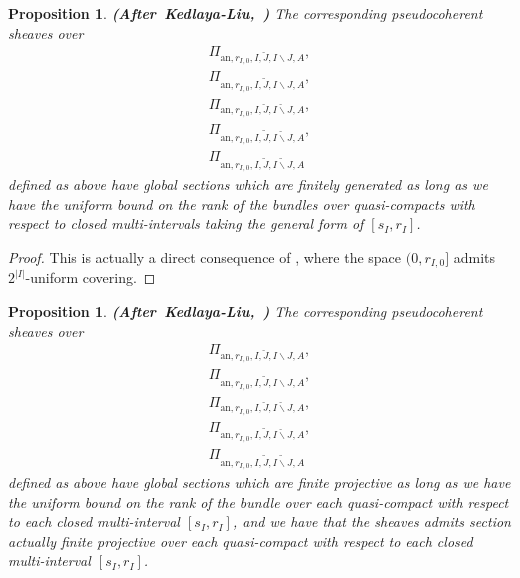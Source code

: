 \documentclass[12pt]{amsart}
\newtheorem{proposition}[theorem]{Proposition}
\theoremstyle{definition}
\numberwithin{equation}{section}
\begin{document}
\begin{proposition} \mbox{\bf{(After Kedlaya-Liu, \cite[Proposition 2.6.17]{KL2})}} \label{proposition2.18}
The corresponding pseudocoherent sheaves over
\begin{align}
\Pi_{\mathrm{an},r_{I,0},I,\breve{J},I\backslash J,A},\\
\Pi_{\mathrm{an},r_{I,0},I,\widetilde{J},I\backslash J,A},\\
\Pi_{\mathrm{an},r_{I,0},I,\breve{J},\breve{I\backslash J},A},\\
\Pi_{\mathrm{an},r_{I,0},I,\widetilde{J},\breve{I\backslash J},A},\\
\Pi_{\mathrm{an},r_{I,0},I,\widetilde{J},\widetilde{I\backslash J},A}
\end{align}
defined as above have global sections which are finitely generated as long as we have the uniform bound on the rank of the bundles over quasi-compacts with respect to closed multi-intervals taking the general form of $[s_I,r_I]$. 	
\end{proposition}


\begin{proof}
This is actually a direct consequence of \cite[Proposition 2.6.17]{KL2}, where the space $(0,r_{I,0}]$ admits $2^{|I|}$-uniform covering.	
\end{proof}


\begin{proposition} \mbox{\bf{(After Kedlaya-Liu, \cite[Corollary 2.6.8, Proposition 2.6.17]{KL2})}} \label{proposition2.19}
The corresponding pseudocoherent sheaves over
\begin{align}
\Pi_{\mathrm{an},r_{I,0},I,\breve{J},I\backslash J,A},\\
\Pi_{\mathrm{an},r_{I,0},I,\widetilde{J},I\backslash J,A},\\
\Pi_{\mathrm{an},r_{I,0},I,\breve{J},\breve{I\backslash J},A},\\
\Pi_{\mathrm{an},r_{I,0},I,\widetilde{J},\breve{I\backslash J},A},\\
\Pi_{\mathrm{an},r_{I,0},I,\widetilde{J},\widetilde{I\backslash J},A}
\end{align}
defined as above have global sections which are finite projective as long as we have the uniform bound on the rank of the bundle over each quasi-compact with respect to each closed multi-interval $[s_I,r_I]$, and we have that the sheaves admits section actually finite projective over each quasi-compact with respect to each closed multi-interval $[s_I,r_I]$. 	
\end{proposition}
\end{document}

